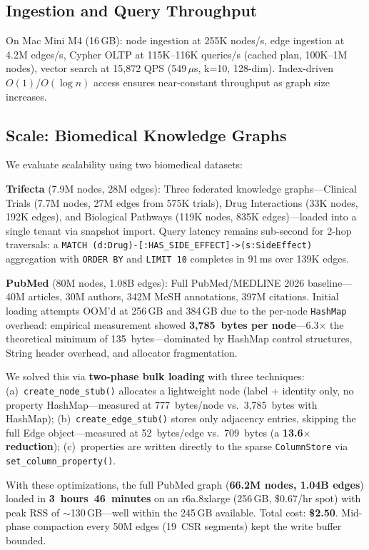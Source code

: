 \documentclass[sigconf, nonacm]{acmart}
\begin{document}
\subsection{Ingestion and Query Throughput}

On Mac Mini M4 (16\,GB): node ingestion at 255K nodes/s, edge ingestion at 4.2M edges/s, Cypher OLTP at 115K--116K queries/s (cached plan, 100K--1M nodes), vector search at 15,872 QPS (549\,$\mu$s, k=10, 128-dim).
Index-driven $O(1)$/$O(\log n)$ access ensures near-constant throughput as graph size increases.

\subsection{Scale: Biomedical Knowledge Graphs}
\label{sec:scale}

We evaluate scalability using two biomedical datasets:

\textbf{Trifecta} (7.9M nodes, 28M edges): Three federated knowledge graphs---Clinical Trials (7.7M nodes, 27M edges from 575K trials), Drug Interactions (33K nodes, 192K edges), and Biological Pathways (119K nodes, 835K edges)---loaded into a single tenant via snapshot import.
Query latency remains sub-second for 2-hop traversals: a \texttt{MATCH (d:Drug)-[:HAS\_SIDE\_EFFECT]->(s:SideEffect)} aggregation with \texttt{ORDER BY} and \texttt{LIMIT 10} completes in 91\,ms over 139K edges.

\textbf{PubMed} (80M nodes, 1.08B edges): Full PubMed/MEDLINE 2026 baseline---40M articles, 30M authors, 342M MeSH annotations, 397M citations.
Initial loading attempts OOM'd at 256\,GB and 384\,GB due to the per-node \texttt{HashMap} overhead: empirical measurement showed \textbf{3,785~bytes per node}---6.3$\times$ the theoretical minimum of 135~bytes---dominated by HashMap control structures, String header overhead, and allocator fragmentation.

We solved this via \textbf{two-phase bulk loading} with three techniques:
(a)~\texttt{create\_node\_stub()} allocates a lightweight node (label + identity only, no property HashMap---measured at 777~bytes/node vs.\ 3,785~bytes with HashMap);
(b)~\texttt{create\_edge\_stub()} stores only adjacency entries, skipping the full Edge object---measured at 52~bytes/edge vs.\ 709~bytes (a \textbf{13.6$\times$ reduction});
(c)~properties are written directly to the sparse \texttt{ColumnStore} via \texttt{set\_column\_property()}.

With these optimizations, the full PubMed graph (\textbf{66.2M nodes, 1.04B edges}) loaded in \textbf{3~hours~46~minutes} on an r6a.8xlarge (256\,GB, \$0.67/hr spot) with peak RSS of ${\sim}$130\,GB---well within the 245\,GB available.
Total cost: \textbf{\$2.50}.
Mid-phase compaction every 50M edges (19~CSR segments) kept the write buffer bounded.
\end{document}
